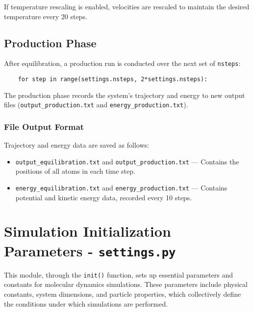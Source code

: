\documentclass[12pt, ngerman]{report}
\begin{document}
If temperature rescaling is enabled, velocities are rescaled to maintain the desired temperature every 20 steps.

\section{Production Phase}
After equilibration, a production run is conducted over the next set of \texttt{nsteps}:
\begin{verbatim}
	for step in range(settings.nsteps, 2*settings.nsteps):
\end{verbatim}
The production phase records the system's trajectory and energy to new output files (\texttt{output\_production.txt} and \texttt{energy\_production.txt}).

\subsection{File Output Format}
Trajectory and energy data are saved as follows:
\begin{itemize}
	\item \texttt{output\_equilibration.txt} and \texttt{output\_production.txt} --- Contains the positions of all atoms in each time step.
	\item \texttt{energy\_equilibration.txt} and \texttt{energy\_production.txt} --- Contains potential and kinetic energy data, recorded every 10 steps.
\end{itemize}


	
\chapter{Simulation Initialization Parameters - \texttt{settings.py}}
\label{chap:simulation_initialization}

This module, through the \texttt{init()} function, sets up essential parameters and constants for molecular dynamics simulations. These parameters include physical constants, system dimensions, and particle properties, which collectively define the conditions under which simulations are performed.
\end{document}
